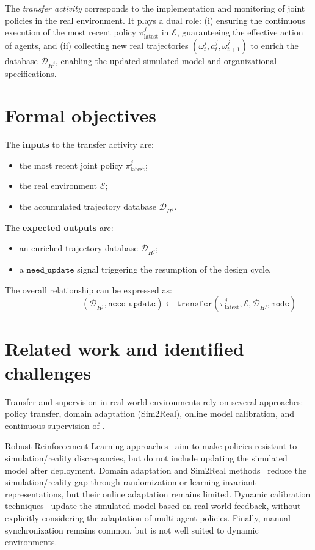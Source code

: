 \begin{itemize}
The \textit{transfer activity} corresponds to the implementation and monitoring of joint policies in the real environment.
It plays a dual role: (i) ensuring the continuous execution of the most recent policy $\pi^j_{\text{latest}}$ in $\mathcal{E}$, guaranteeing the effective action of agents, and (ii) collecting new real trajectories $(\omega^j_t, a^j_t, \omega^j_{t+1})$ to enrich the database $\mathcal{D}_{H^j}$, enabling the updated simulated model and organizational specifications.

\section*{Formal objectives}

The \textbf{inputs} to the transfer activity are:
\begin{itemize}
  \item the most recent joint policy $\pi^j_{\text{latest}}$;
  \item the real environment $\mathcal{E}$;
  \item the accumulated trajectory database $\mathcal{D}_{H^j}$.
\end{itemize}

\noindent
The \textbf{expected outputs} are:
\begin{itemize}
  \item an enriched trajectory database $\mathcal{D}_{H^j}$;
  \item a $\texttt{need\_update}$ signal triggering the resumption of the design cycle.
\end{itemize}

The overall relationship can be expressed as:
\[
  \hspace{3cm}(\mathcal{D}_{H^j}, \texttt{need\_update}) \gets \texttt{transfer}(\pi^j_{\text{latest}}, \mathcal{E}, \mathcal{D}_{H^j}, \texttt{mode})
\]

\section{Related work and identified challenges}

Transfer and supervision in real-world environments rely on several approaches: policy transfer, domain adaptation (Sim2Real), online model calibration, and continuous supervision of .

Robust Reinforcement Learning approaches~\cite{pinto2017robust} aim to make policies resistant to simulation/reality discrepancies, but do not include updating the simulated model after deployment. Domain adaptation and Sim2Real methods~\cite{tobin2017domain,ganin2016domain} reduce the simulation/reality gap through randomization or learning invariant representations, but their online adaptation remains limited. Dynamic calibration techniques~\cite{deisenroth2011pilco} update the simulated model based on real-world feedback, without explicitly considering the adaptation of multi-agent policies. Finally, manual synchronization remains common, but is not well suited to dynamic environments.


\end{itemize}
